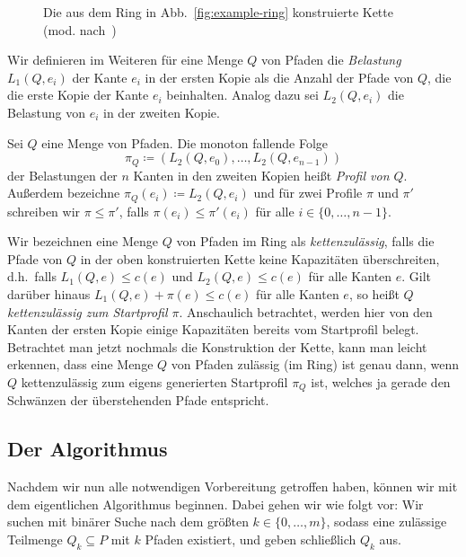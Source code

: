 \begin{figure}[htbp]
    \centering
    \def\svgwidth{270bp}
    
    \caption{Die aus dem Ring in Abb.~\ref{fig:example-ring} konstruierte Kette (mod. nach~\cite{paper})}
    \label{fig:example-ring-to-chain}
\end{figure}

Wir definieren im Weiteren für eine Menge $Q$ von Pfaden die {\em Belastung} $L_1(Q, e_i)$ der Kante
$e_i$ in der ersten Kopie als die Anzahl der Pfade von $Q$, die die erste Kopie der Kante $e_i$ beinhalten.
Analog dazu sei $L_2(Q, e_i)$ die Belastung von $e_i$ in der zweiten Kopie.
\begin{definition}[Profil]
    Sei $Q$ eine Menge von Pfaden.
    Die monoton fallende Folge
    \[\pi_{Q}\coloneqq  (L_2(Q, e_0), \dots, L_2(Q, e_{n-1}))\]
    der Belastungen der $n$ Kanten in den zweiten Kopien heißt {\em Profil von $Q$}.
    Außerdem bezeichne $\pi_Q(e_i) \coloneqq L_2(Q, e_i)$ und für zwei Profile $\pi$ und $\pi'$ schreiben wir $\pi \leq \pi'$,
    falls $\pi(e_i) \leq \pi'(e_i)$ für alle $i \in \{0,\dots,n-1\}$.
\end{definition}
Wir bezeichnen eine Menge $Q$ von Pfaden im Ring als {\em kettenzulässig},
falls die Pfade von $Q$ in der oben konstruierten Kette keine Kapazitäten überschreiten, d.h.\ falls $L_1(Q, e) \leq c(e)$ und
$L_2(Q, e) \leq c(e)$ für alle Kanten $e$.
Gilt darüber hinaus $L_1(Q, e) + \pi(e) \leq c(e)$ für alle Kanten $e$, so heißt $Q$ {\em kettenzulässig zum Startprofil $\pi$}.
Anschaulich betrachtet, werden hier von den Kanten der ersten Kopie einige Kapazitäten bereits vom Startprofil belegt.
Betrachtet man jetzt nochmals die Konstruktion der Kette, kann man leicht erkennen, dass eine Menge $Q$ von Pfaden zulässig
(im Ring) ist genau dann, wenn $Q$ kettenzulässig zum eigens generierten Startprofil $\pi_Q$ ist, welches ja gerade den
Schwänzen der überstehenden Pfade entspricht.

\subsection{Der Algorithmus}

Nachdem wir nun alle notwendigen Vorbereitung getroffen haben, können wir mit dem eigentlichen Algorithmus beginnen.
Dabei gehen wir wie folgt vor:
Wir suchen mit binärer Suche nach dem größten $k \in \{0, \dots, m\}$, sodass eine zulässige Teilmenge $Q_k \subseteq P$
mit $k$ Pfaden existiert, und geben schließlich $Q_k$ aus.

